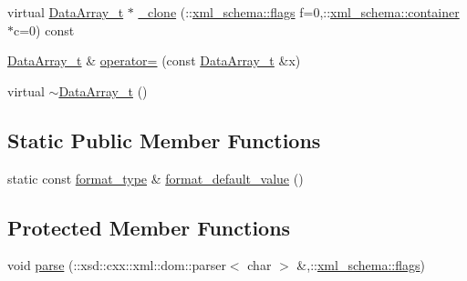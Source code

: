 \begin{DoxyCompactItemize}
\item 
virtual \hyperlink{classDataArray__t}{Data\+Array\+\_\+t} $\ast$ \hyperlink{classDataArray__t_a0ba3569846912b9fcadbd942e914cce1}{\+\_\+clone} (\+::\hyperlink{namespacexml__schema_a0612287d030cb2732d31a45b258fdc87}{xml\+\_\+schema\+::flags} f=0,\+::\hyperlink{namespacexml__schema_ada9aa30dc722e93ee2ed7243085402a5}{xml\+\_\+schema\+::container} $\ast$c=0) const 
\item 
\hyperlink{classDataArray__t}{Data\+Array\+\_\+t} \& \hyperlink{classDataArray__t_acaa5dfa86244de30a94634a9430e0f2d}{operator=} (const \hyperlink{classDataArray__t}{Data\+Array\+\_\+t} \&x)
\item 
virtual \hyperlink{classDataArray__t_ac9806a5eedf7abecd7adf6408c8af894}{$\sim$\+Data\+Array\+\_\+t} ()
\end{DoxyCompactItemize}
\subsection*{Static Public Member Functions}
\begin{DoxyCompactItemize}
\item 
static const \hyperlink{classDataArray__t_ae453ea653980baef2e3296005d70bfbd}{format\+\_\+type} \& \hyperlink{classDataArray__t_ade99ea2c2fdc45cc2826b6847dfb5404}{format\+\_\+default\+\_\+value} ()
\end{DoxyCompactItemize}
\subsection*{Protected Member Functions}
\begin{DoxyCompactItemize}
\item 
void \hyperlink{classDataArray__t_a08396be94c9f535e1d8e7c68941f7833}{parse} (\+::xsd\+::cxx\+::xml\+::dom\+::parser$<$ char $>$ \&,\+::\hyperlink{namespacexml__schema_a0612287d030cb2732d31a45b258fdc87}{xml\+\_\+schema\+::flags})
\end{DoxyCompactItemize}
